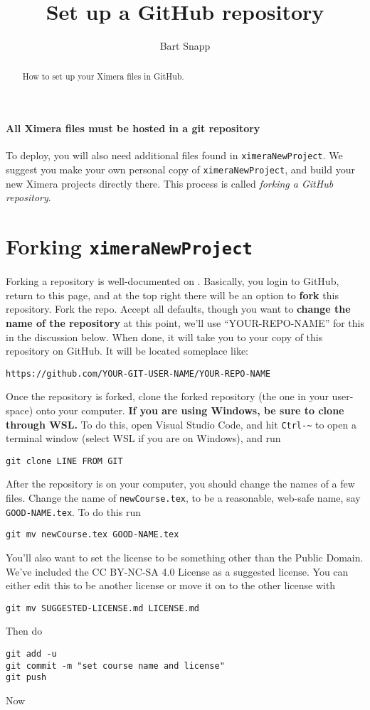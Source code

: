 \documentclass{ximera}
\title{Set up a GitHub repository}
\author{Bart Snapp}
\begin{document}
\begin{abstract}
  How to set up your Ximera files in GitHub.
\end{abstract}
\maketitle

\paragraph{All Ximera files must be hosted in a git repository} To deploy, you
will also need	additional
files found in \verb!ximeraNewProject!. We suggest you make your own personal copy of  \verb!ximeraNewProject!, and build your new Ximera projects directly there.
This process is called \textit{forking a GitHub repository}.



\section{Forking \texttt{ximeraNewProject}}

Forking a repository is well-documented on
.
Basically, you login to GitHub, return to this page, and at the top right there
will be an option to \textbf{fork} this repository. Fork the repo. Accept all
defaults, though you want to \textbf{change the name of the repository} at this
point, we'll use ``YOUR-REPO-NAME'' for this in the discussion below. When done, it will take you to
your copy of this repository on GitHub. It will be located someplace like:
\begin{center}
  \texttt{https://github.com/YOUR-GIT-USER-NAME/YOUR-REPO-NAME}
\end{center}
Once the repository is forked, clone the forked repository (the one in your
user-space) onto your computer. \textbf{If you are using Windows, be sure to
  clone through WSL.} To do this, open Visual Studio Code, and hit \verb!Ctrl-~! to open a terminal window (select WSL if you are on Windows), and run
\begin{verbatim}
git clone LINE FROM GIT
\end{verbatim}
After the repository is on your computer, you should change the names of a few files. Change the name of \verb!newCourse.tex!, to be a reasonable, web-safe name, say \verb!GOOD-NAME.tex!. 
To do this run
\begin{verbatim}
git mv newCourse.tex GOOD-NAME.tex
\end{verbatim}
You'll also want to set the license to be something other than the Public Domain. We've included the CC BY-NC-SA 4.0
License as a suggested license. You can either edit this to be another license or move it on to the other license with
\begin{verbatim}
git mv SUGGESTED-LICENSE.md LICENSE.md
\end{verbatim}
Then do
\begin{verbatim}
git add -u 
git commit -m "set course name and license"
git push
\end{verbatim}
Now 
\end{document}
